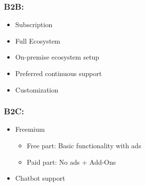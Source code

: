 \subsubsection*{B2B:}
\begin{itemize}
    \item Subscription
    \item Full Ecosystem
    \item On-premise ecosystem setup
    \item Preferred continuous support
    \item Customization
\end{itemize}

\subsubsection*{B2C:}
\begin{itemize}
    \item Freemium
    \begin{itemize}
        \item Free part: Basic functionality with ads
        \item Paid part: No ads + Add-Ons
    \end{itemize}
    \item Chatbot support
\end{itemize}

